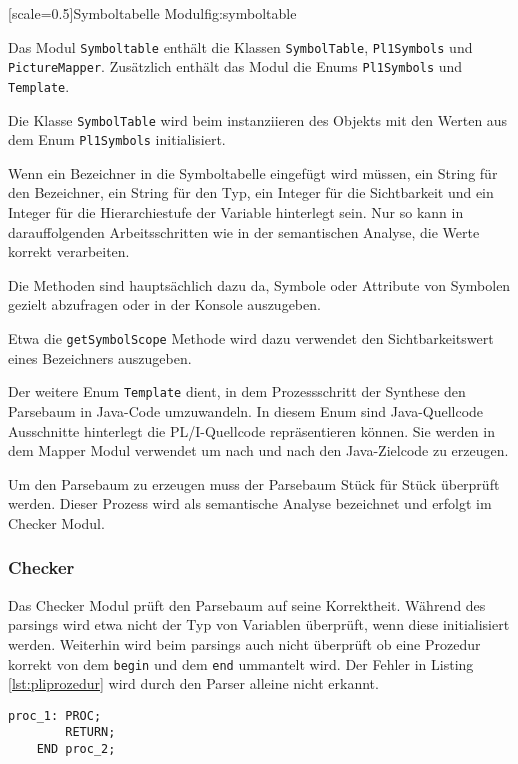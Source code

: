 [scale=0.5]{Symboltabelle Modul}{fig:symboltable}
\pagebreak

Das Modul \verb+Symboltable+ enthält die Klassen \verb+SymbolTable+, \verb+Pl1Symbols+ und \verb+PictureMapper+.
Zusätzlich enthält das Modul die Enums \verb+Pl1Symbols+ und \verb+Template+.

Die Klasse \verb+SymbolTable+ wird beim instanziieren des Objekts mit den Werten aus dem Enum \verb+Pl1Symbols+ initialisiert. 

Wenn ein Bezeichner in die Symboltabelle eingefügt wird müssen, ein String für den Bezeichner, ein String für den Typ, ein Integer für die Sichtbarkeit und ein Integer für die Hierarchiestufe der Variable hinterlegt sein. Nur so kann in darauffolgenden Arbeitsschritten wie in der semantischen Analyse, die Werte korrekt verarbeiten.

Die Methoden sind hauptsächlich dazu da, Symbole oder Attribute von Symbolen gezielt abzufragen oder in der Konsole auszugeben.

Etwa die \verb+getSymbolScope+ Methode wird dazu verwendet den Sichtbarkeitswert eines Bezeichners auszugeben.

Der weitere Enum \verb+Template+ dient, in dem Prozessschritt der Synthese den Parsebaum in Java-Code umzuwandeln.
In diesem Enum sind Java-Quellcode Ausschnitte hinterlegt die PL/I-Quellcode repräsentieren können. Sie werden in dem Mapper Modul verwendet
um nach und nach den Java-Zielcode zu erzeugen.

Um den Parsebaum zu erzeugen muss der Parsebaum Stück für Stück überprüft werden. Dieser Prozess wird als semantische Analyse bezeichnet und erfolgt im Checker Modul.
 
\subsubsection{Checker}
Das Checker Modul prüft den Parsebaum auf seine Korrektheit. Während des parsings wird etwa nicht der Typ von Variablen überprüft, wenn diese initialisiert werden. Weiterhin wird beim parsings auch nicht überprüft ob eine Prozedur korrekt von dem \verb+begin+ und dem \verb+end+ ummantelt wird. Der Fehler in Listing \ref{lst:pliprozedur} wird durch den Parser alleine nicht erkannt.

 \begin{lstlisting}[language=PL/I, caption=PL/I Prozedur, label={lst:pliprozedur}]
 	proc_1: PROC;
 		RETURN;
 	END proc_2;
\end{lstlisting}


